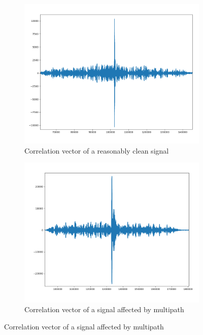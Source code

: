 \documentclass[a4paper]{article}
\begin{document}
\begin{figure}[H]
    \centering
    \begin{subfigure}{0.45\textwidth}
        \includegraphics[width=1\textwidth]{correlation_clean.png}
        \caption{Correlation vector of a reasonably clean signal}
    \end{subfigure}
    \begin{subfigure}{0.45\textwidth}
        \includegraphics[width=1\textwidth]{correlation_multipath.png}
        \caption{Correlation vector of a signal affected by multipath}
    \end{subfigure}
\end{figure}
\end{document}
